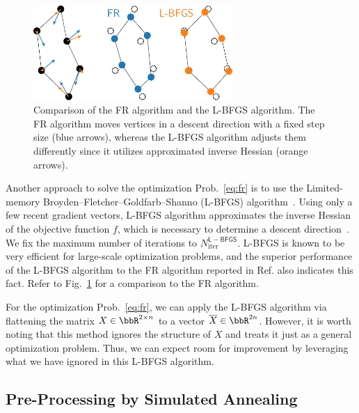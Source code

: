 \documentclass[dvipdfmx,10pt,journal,compsoc]{IEEEtran}
\begin{document}
\begin{figure}[t]
  \centering
  \includegraphics[height=3.59cm]{comparison/comparison_FRandLBFGS.pdf}
  \caption{
    Comparison of the FR algorithm and the L-BFGS algorithm.
    The FR algorithm moves vertices in a descent direction with a fixed step size (blue arrows), whereas the L-BFGS algorithm adjusts them differently since it utilizes approximated inverse Hessian (orange arrows).
  }
  \label{fig:comparisonFRandLBFGS}
\end{figure}

Another approach to solve the optimization Prob.~\eqref{eq:fr} is to use the Limited-memory Broyden--Fletcher--Goldfarb--Shanno (L-BFGS) algorithm~\cite{6183577}.
Using only a few recent gradient vectors, L-BFGS algorithm approximates the inverse Hessian of the objective function $f$, which is necessary to determine a descent direction~\cite{liuLimitedMemoryBFGS1989}.
We fix the maximum number of iterations to $N_\mathrm{iter}^{\mathsf{L-BFGS}}$.
L-BFGS is known to be very efficient for large-scale optimization problems, and the superior performance of the L-BFGS algorithm to the FR algorithm reported in Ref.\cite{6183577} also indicates this fact. Refer to Fig.~\ref{fig:comparisonFRandLBFGS} for a comparison to the FR algorithm.

For the optimization Prob.~\eqref{eq:fr}, we can apply the L-BFGS algorithm via flattening the matrix $X \in \bbR^{2 \times n}$ to a vector $\overline{X} \in \bbR^{2n}$.
However, it is worth noting that this method ignores the structure of $X$ and treats it just as a general optimization problem.
Thus, we can expect room for improvement by leveraging what we have ignored in this L-BFGS algorithm.

\subsection{Pre-Processing by Simulated Annealing}\label{ssec:preprocessing}
\end{document}
